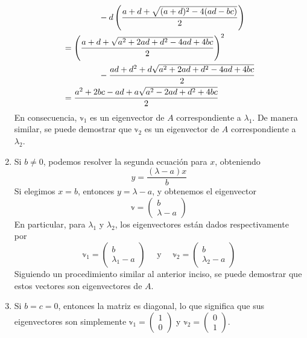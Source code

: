 \begin{enumerate}[label=\roman*)]
\begin{align*}
        & \hspace{1.5cm} - d \left( \frac{a + d + \sqrt{(a + d)^2 - 4(ad - bc)}}{2} \right) \\
        & = \left( \frac{a + d + \sqrt{a^2 + 2ad + d^2 - 4ad + 4bc}}{2} \right)^2 \\
        & \hspace{1.5cm} - \frac{ad + d^2 + d\sqrt{a^2 + 2ad + d^2 - 4ad + 4bc}}{2} \\
        & = \frac{a^2 + 2bc - ad + a\sqrt{a^2 - 2ad + d^2 + 4bc}}{2}
    \end{align*}
    En consecuencia, $\mathbb{v}_1$ es un eigenvector de $A$ correspondiente a $\lambda_1$. De manera similar, se puede demostrar que $\mathbb{v}_2$ es un eigenvector de $A$ correspondiente a $\lambda_2$.
    \item Si $b \neq 0$, podemos resolver la segunda ecuación para $x$, obteniendo
    $$y = \frac{( \lambda - a )x}{b}$$
    Si elegimos $x = b$, entonces $y = \lambda - a$, y obtenemos el eigenvector
    $$\mathbb{v} = \begin{pmatrix} b \\ \lambda - a \end{pmatrix}$$
    En particular, para $\lambda_1$ y $\lambda_2$, los eigenvectores están dados respectivamente por
    $$\mathbb{v}_1 = \begin{pmatrix} b \\ \lambda_1 - a \end{pmatrix} \quad \text{ y } \quad \mathbb{v}_2 = \begin{pmatrix} b \\ \lambda_2 - a \end{pmatrix}$$
    Siguiendo un procedimiento similar al anterior inciso, se puede demostrar que estos vectores son eigenvectores de $A$.
    \item Si $b = c = 0$, entonces la matriz es diagonal, lo que significa que sus eigenvectores son simplemente $\mathbb{v}_1 = \begin{pmatrix} 1 \\ 0 \end{pmatrix}$ y $\mathbb{v}_2 = \begin{pmatrix} 0 \\ 1 \end{pmatrix}$.
\end{enumerate}

